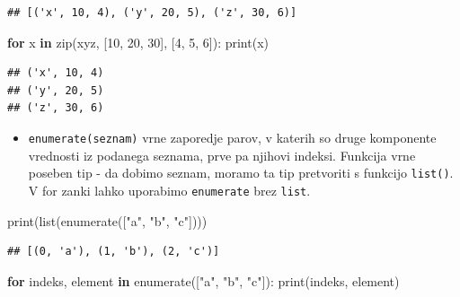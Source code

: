 \documentclass[
]{report}
\newenvironment{Shaded}{\begin{snugshade}}{\end{snugshade}}
\newcommand{\BuiltInTok}[1]{#1}
\newcommand{\ControlFlowTok}[1]{\textcolor[rgb]{0.13,0.29,0.53}{\textbf{#1}}}
\newcommand{\DecValTok}[1]{\textcolor[rgb]{0.00,0.00,0.81}{#1}}
\newcommand{\KeywordTok}[1]{\textcolor[rgb]{0.13,0.29,0.53}{\textbf{#1}}}
\newcommand{\NormalTok}[1]{#1}
\newcommand{\StringTok}[1]{\textcolor[rgb]{0.31,0.60,0.02}{#1}}
\providecommand{\tightlist}{%
  \setlength{\itemsep}{0pt}\setlength{\parskip}{0pt}}
\begin{document}
\begin{verbatim}
## [('x', 10, 4), ('y', 20, 5), ('z', 30, 6)]
\end{verbatim}

\begin{Shaded}
\begin{Highlighting}[]
\ControlFlowTok{for}\NormalTok{ x }\KeywordTok{in} \BuiltInTok{zip}\NormalTok{(}\StringTok{\textquotesingle{}xyz\textquotesingle{}}\NormalTok{, [}\DecValTok{10}\NormalTok{, }\DecValTok{20}\NormalTok{, }\DecValTok{30}\NormalTok{], [}\DecValTok{4}\NormalTok{, }\DecValTok{5}\NormalTok{, }\DecValTok{6}\NormalTok{]):}
    \BuiltInTok{print}\NormalTok{(x)}
\end{Highlighting}
\end{Shaded}

\begin{verbatim}
## ('x', 10, 4)
## ('y', 20, 5)
## ('z', 30, 6)
\end{verbatim}

\begin{itemize}
\tightlist
\item
  \texttt{enumerate(seznam)} vrne zaporedje parov, v katerih so druge komponente vrednosti
  iz podanega seznama, prve pa njihovi indeksi.
  Funkcija vrne poseben tip - da dobimo seznam, moramo ta tip
  pretvoriti s funkcijo \texttt{list()}. V for zanki lahko uporabimo \texttt{enumerate} brez \texttt{list}.
\end{itemize}

\begin{Shaded}
\begin{Highlighting}[]
\BuiltInTok{print}\NormalTok{(}\BuiltInTok{list}\NormalTok{(}\BuiltInTok{enumerate}\NormalTok{([}\StringTok{"a"}\NormalTok{, }\StringTok{"b"}\NormalTok{, }\StringTok{"c"}\NormalTok{])))}
\end{Highlighting}
\end{Shaded}

\begin{verbatim}
## [(0, 'a'), (1, 'b'), (2, 'c')]
\end{verbatim}

\begin{Shaded}
\begin{Highlighting}[]
\ControlFlowTok{for}\NormalTok{ indeks, element }\KeywordTok{in} \BuiltInTok{enumerate}\NormalTok{([}\StringTok{"a"}\NormalTok{, }\StringTok{"b"}\NormalTok{, }\StringTok{"c"}\NormalTok{]):}
    \BuiltInTok{print}\NormalTok{(indeks, element)}
\end{Highlighting}
\end{Shaded}
\end{document}
